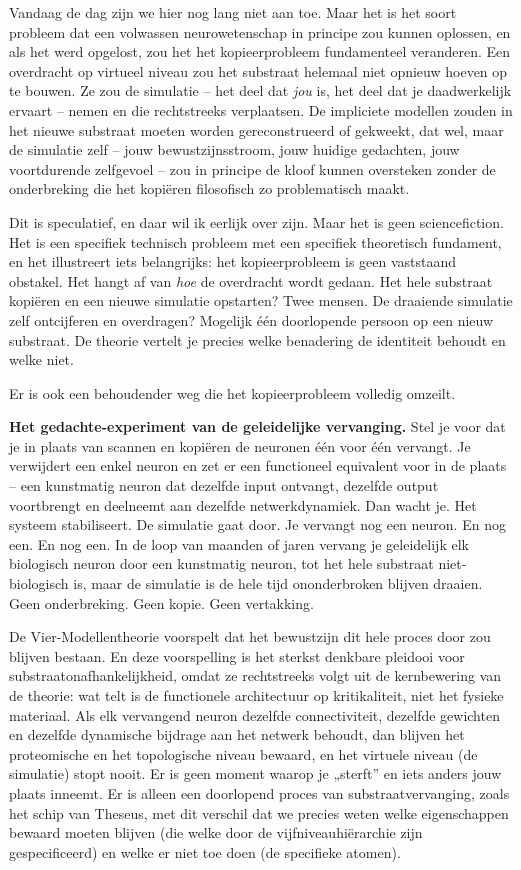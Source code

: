 \documentclass[11pt, twoside, openright]{book}
\begin{document}
Vandaag de dag zijn we hier nog lang niet aan toe. Maar het is het soort probleem dat een volwassen neurowetenschap in principe zou kunnen oplossen, en als het werd opgelost, zou het het kopieerprobleem fundamenteel veranderen. Een overdracht op virtueel niveau zou het substraat helemaal niet opnieuw hoeven op te bouwen. Ze zou de simulatie -- het deel dat \textit{jou} is, het deel dat je daadwerkelijk ervaart -- nemen en die rechtstreeks verplaatsen. De impliciete modellen zouden in het nieuwe substraat moeten worden gereconstrueerd of gekweekt, dat wel, maar de simulatie zelf -- jouw bewustzijnsstroom, jouw huidige gedachten, jouw voortdurende zelfgevoel -- zou in principe de kloof kunnen oversteken zonder de onderbreking die het kopiëren filosofisch zo problematisch maakt.

Dit is speculatief, en daar wil ik eerlijk over zijn. Maar het is geen sciencefiction. Het is een specifiek technisch probleem met een specifiek theoretisch fundament, en het illustreert iets belangrijks: het kopieerprobleem is geen vaststaand obstakel. Het hangt af van \textit{hoe} de overdracht wordt gedaan. Het hele substraat kopiëren en een nieuwe simulatie opstarten? Twee mensen. De draaiende simulatie zelf ontcijferen en overdragen? Mogelijk één doorlopende persoon op een nieuw substraat. De theorie vertelt je precies welke benadering de identiteit behoudt en welke niet.

Er is ook een behoudender weg die het kopieerprobleem volledig omzeilt.

\textbf{Het gedachte-experiment van de geleidelijke vervanging.} Stel je voor dat je in plaats van scannen en kopiëren de neuronen één voor één vervangt. Je verwijdert een enkel neuron en zet er een functioneel equivalent voor in de plaats -- een kunstmatig neuron dat dezelfde input ontvangt, dezelfde output voortbrengt en deelneemt aan dezelfde netwerkdynamiek. Dan wacht je. Het systeem stabiliseert. De simulatie gaat door. Je vervangt nog een neuron. En nog een. En nog een. In de loop van maanden of jaren vervang je geleidelijk elk biologisch neuron door een kunstmatig neuron, tot het hele substraat niet-biologisch is, maar de simulatie is de hele tijd ononderbroken blijven draaien. Geen onderbreking. Geen kopie. Geen vertakking.

De Vier-Modellentheorie voorspelt dat het bewustzijn dit hele proces door zou blijven bestaan. En deze voorspelling is het sterkst denkbare pleidooi voor substraatonafhankelijkheid, omdat ze rechtstreeks volgt uit de kernbewering van de theorie: wat telt is de functionele architectuur op kritikaliteit, niet het fysieke materiaal. Als elk vervangend neuron dezelfde connectiviteit, dezelfde gewichten en dezelfde dynamische bijdrage aan het netwerk behoudt, dan blijven het proteomische en het topologische niveau bewaard, en het virtuele niveau (de simulatie) stopt nooit. Er is geen moment waarop je „sterft” en iets anders jouw plaats inneemt. Er is alleen een doorlopend proces van substraatvervanging, zoals het schip van Theseus, met dit verschil dat we precies weten welke eigenschappen bewaard moeten blijven (die welke door de vijfniveauhiërarchie zijn gespecificeerd) en welke er niet toe doen (de specifieke atomen).
\end{document}
